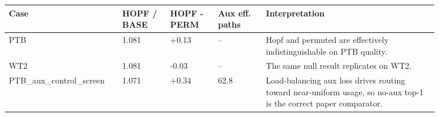 \begin{tabular}{p{0.19\linewidth}p{0.10\linewidth}p{0.10\linewidth}p{0.10\linewidth}p{0.36\linewidth}}
\toprule
Case & HOPF / BASE & HOPF - PERM & Aux eff. paths & Interpretation \\
\midrule
PTB & 1.081 & +0.13 & -- & Hopf and permuted are effectively indistinguishable on PTB quality. \\
WT2 & 1.081 & -0.03 & -- & The same null result replicates on WT2. \\
PTB\_aux\_control\_screen & 1.071 & +0.34 & 62.8 & Load-balancing aux loss drives routing toward near-uniform usage, so no-aux top-1 is the correct paper comparator. \\
\bottomrule
\end{tabular}
